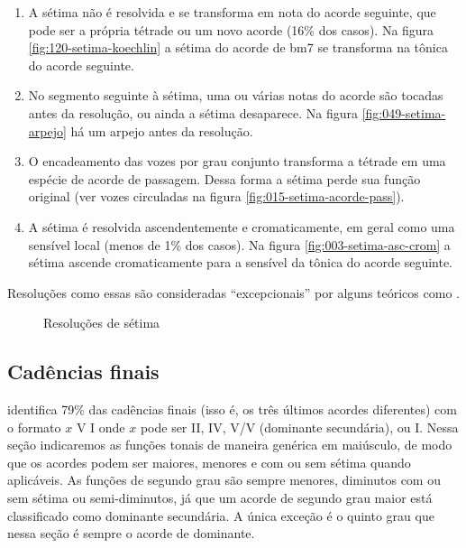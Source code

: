 \begin{enumerate}
\item A sétima não é resolvida e se transforma em nota do acorde
  seguinte, que pode ser a própria tétrade ou um novo acorde (16\% dos
  casos). Na figura \ref{fig:120-setima-koechlin} a sétima do acorde
  de bm7 se transforma na tônica do acorde seguinte.
\item No segmento seguinte à sétima, uma ou várias notas do acorde são
  tocadas antes da resolução, ou ainda a sétima desaparece. Na figura
  \ref{fig:049-setima-arpejo} há um arpejo antes da resolução.
\item O encadeamento das vozes por grau conjunto transforma a tétrade
  em uma espécie de acorde de passagem. Dessa forma a sétima perde sua
  função original (ver vozes circuladas na figura
  \ref{fig:015-setima-acorde-pass}).
\item A sétima é resolvida ascendentemente e cromaticamente, em geral
  como uma sensível local (menos de 1\% dos casos). Na figura
  \ref{fig:003-setima-asc-crom} a sétima ascende cromaticamente para a
  sensível da tônica do acorde seguinte.
\end{enumerate}

Resoluções como essas são consideradas ``excepcionais'' por alguns
teóricos como \cite{koechlin46:traite}.

\begin{figure}[!h]
  \centering
  \caption{Resoluções de sétima}
  \label{fig:setima-resol}
\end{figure}

\subsection{Cadências finais}
\label{sec:cadencias}

\rameau{} identifica 79\% das cadências finais (isso é, os três
últimos acordes diferentes) com o formato $x$ V I onde $x$ pode ser
II, IV, V/V (dominante secundária), ou I. Nessa seção indicaremos as
funções tonais de maneira genérica em maiúsculo, de modo que os
acordes podem ser maiores, menores e com ou sem sétima quando
aplicáveis. As funções de segundo grau são sempre menores, diminutos
com ou sem sétima ou semi-diminutos, já que um acorde de segundo grau
maior está classificado como dominante secundária. A única exceção é o
quinto grau que nessa seção é sempre o acorde de dominante.

